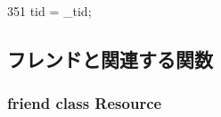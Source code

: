\begin{DoxyCode}
351 { tid = _tid; }
\end{DoxyCode}


\subsection{フレンドと関連する関数}
\hypertarget{classResourceRequest_a0ebbdc315d2466b93b663656f9d9ab44}{
\subsubsection[{Resource}]{\setlength{\rightskip}{0pt plus 5cm}friend class {\bf Resource}}}
\label{classResourceRequest_a0ebbdc315d2466b93b663656f9d9ab44}


